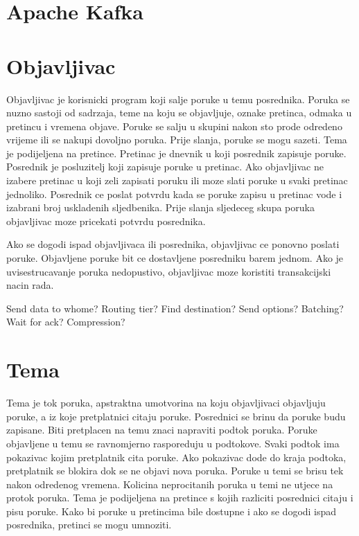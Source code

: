 \documentclass[times, utf8, diplomski, numeric]{fer}
\begin{document}
\chapter{Apache Kafka}



\chapter{Objavljivac}
Objavljivac je korisnicki program koji salje poruke u temu posrednika. Poruka se nuzno sastoji od sadrzaja, teme na koju se objavljuje, oznake pretinca, odmaka u pretincu i vremena objave. Poruke se salju u skupini nakon sto prode odredeno vrijeme ili se nakupi dovoljno poruka. Prije slanja, poruke se mogu sazeti. Tema je podijeljena na pretince. Pretinac je dnevnik u koji posrednik zapisuje poruke. Posrednik je posluzitelj koji zapisuje poruke u pretinac. Ako objavljivac ne izabere pretinac u koji zeli zapisati poruku ili moze slati poruke u svaki pretinac jednoliko. Posrednik ce poslat potvrdu kada se poruke zapisu u pretinac vode i izabrani broj uskladenih sljedbenika. Prije slanja sljedeceg skupa poruka objavljivac moze pricekati potvrdu posrednika. 

Ako se dogodi ispad objavljivaca ili posrednika, objavljivac ce ponovno poslati poruke. Objavljene poruke bit ce dostavljene posredniku barem jednom. Ako je uvisestrucavanje poruka nedopustivo, objavljivac moze koristiti transakcijski nacin rada. 

Send data to whome?
Routing tier?
Find destination?
Send options?
Batching?
Wait for ack?
Compression?


\chapter{Tema}
Tema je tok poruka, apstraktna umotvorina na koju objavljivaci objavljuju poruke, a iz koje pretplatnici citaju poruke. Posrednici se brinu da poruke budu zapisane. Biti pretplacen na temu znaci napraviti podtok poruka. Poruke objavljene u temu se ravnomjerno rasporeduju u podtokove. Svaki podtok ima pokazivac kojim pretplatnik cita poruke. Ako pokazivac dode do kraja podtoka, pretplatnik se blokira dok se ne objavi nova poruka. Poruke u temi se brisu tek nakon odredenog vremena. Kolicina neprocitanih poruka u temi ne utjece na protok poruka. Tema je podijeljena na pretince s kojih razliciti posrednici citaju i pisu poruke. Kako bi poruke u pretincima bile dostupne i ako se dogodi ispad posrednika, pretinci se mogu umnoziti.
\end{document}
